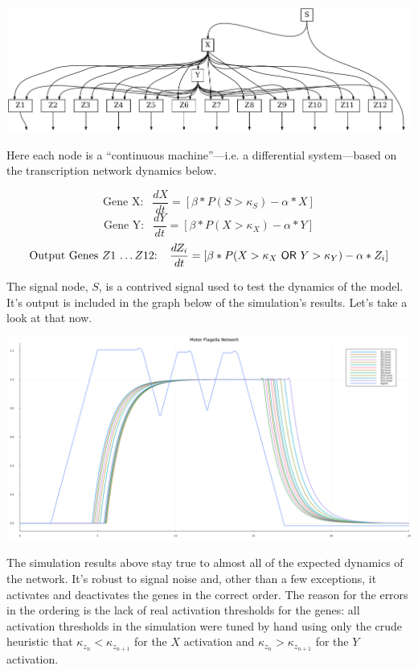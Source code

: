 \documentclass[12pt]{article}
\begin{document}
\begin{center}
  \includegraphics*[scale=0.5]{motor_flagella_network.png}
\end{center}

Here each node is a ``continuous machine''---i.e. a differential system---based on the transcription network dynamics below.

$$\text{Gene X: } \ \ \frac{dX}{dt} = [\beta*P(S > \kappa_S) - \alpha * X]$$
$$\text{Gene Y: } \ \ \frac{dY}{dt} = [\beta*P(X > \kappa_X) - \alpha * Y]$$
$$\text{Output Genes $Z1$ \dots $Z12$: } \ \ \frac{dZ_i}{dt} = [\beta*P(X > \kappa_X \ \mathsf{OR} \ Y > \kappa_Y) - \alpha * Z_i]$$

The signal node, $S$, is a contrived signal used to test the dynamics of the model.
It's output is included in the graph below of the simulation's results.
Let's take a look at that now.

\begin{center}
  \includegraphics*[scale=0.25]{motor_flagella.png}
\end{center}

The simulation results above stay true to almost all of the expected dynamics of the network.
It's robust to signal noise and, other than a few exceptions, it activates and deactivates the genes in the correct order.
The reason for the errors in the ordering is the lack of real activation thresholds for the genes: all activation thresholds in the simulation were tuned by hand using only the crude heuristic that $\kappa_{z_n} < \kappa_{z_{n+1}}$ for the $X$ activation and $\kappa_{z_n} > \kappa_{z_{n+1}}$ for the $Y$ activation.
\end{document}
